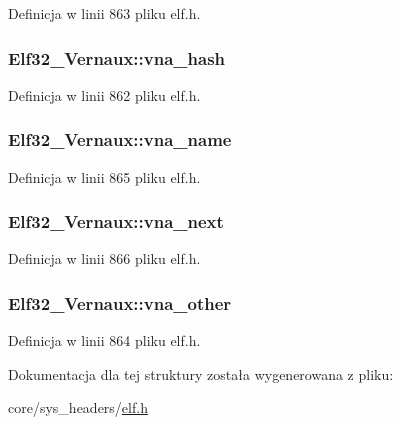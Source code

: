 Definicja w linii 863 pliku elf.\-h.

\hypertarget{struct_elf32___vernaux_aeae097b35e2038c53eabb3fe3e0c7bf1}{
\subsubsection[{vna\-\_\-hash}]{ Elf32\-\_\-\-Vernaux\-::vna\-\_\-hash}}\label{struct_elf32___vernaux_aeae097b35e2038c53eabb3fe3e0c7bf1}


Definicja w linii 862 pliku elf.\-h.

\hypertarget{struct_elf32___vernaux_a8bf6007fe319d74753d03d0fa7977002}{
\subsubsection[{vna\-\_\-name}]{ Elf32\-\_\-\-Vernaux\-::vna\-\_\-name}}\label{struct_elf32___vernaux_a8bf6007fe319d74753d03d0fa7977002}


Definicja w linii 865 pliku elf.\-h.

\hypertarget{struct_elf32___vernaux_acff2104085a8a54ccbb16b0f00be5375}{
\subsubsection[{vna\-\_\-next}]{ Elf32\-\_\-\-Vernaux\-::vna\-\_\-next}}\label{struct_elf32___vernaux_acff2104085a8a54ccbb16b0f00be5375}


Definicja w linii 866 pliku elf.\-h.

\hypertarget{struct_elf32___vernaux_a28f6da095d6169a589ab3bad837258fc}{
\subsubsection[{vna\-\_\-other}]{ Elf32\-\_\-\-Vernaux\-::vna\-\_\-other}}\label{struct_elf32___vernaux_a28f6da095d6169a589ab3bad837258fc}


Definicja w linii 864 pliku elf.\-h.



Dokumentacja dla tej struktury została wygenerowana z pliku\-:\begin{DoxyCompactItemize}
\item 
core/sys\-\_\-headers/\hyperlink{elf_8h}{elf.\-h}\end{DoxyCompactItemize}
